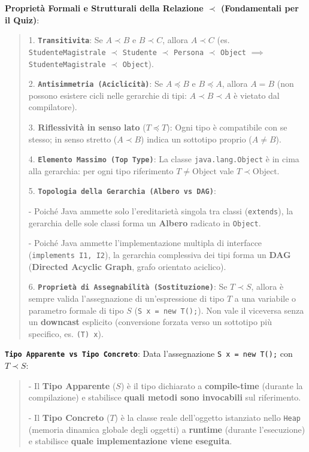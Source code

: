 \textbf{Proprietà Formali e Strutturali della Relazione $\prec$ (Fondamentali per il Quiz)}:

\begin{quote}\small

1. \textbf{\texttt{Transitivita}}: Se $A \prec B$ e $B \prec C$, allora $A \prec C$ (es. \texttt{StudenteMagistrale} $\prec$ \texttt{Studente} $\prec$ \texttt{Persona} $\prec$ \texttt{Object} $\implies$ \texttt{StudenteMagistrale} $\prec$ \texttt{Object}).

2. \textbf{\texttt{Antisimmetria (Aciclicità)}}: Se $A \preceq B$ e $B \preceq A$, allora $A = B$ (non possono esistere cicli nelle gerarchie di tipi: $A \prec B \prec A$ è vietato dal compilatore).

3. \textbf{Riflessività in senso lato} ($T \preceq T$): Ogni tipo è compatibile con se stesso; in senso stretto ($A \prec B$) indica un sottotipo proprio ($A \neq B$).

4. \textbf{\texttt{Elemento Massimo (Top Type)}}: La classe \texttt{java.lang.Object} è in cima alla gerarchia: per ogni tipo riferimento $T \neq \text{Object}$ vale $T \prec \text{Object}$.

5. \textbf{\texttt{Topologia della Gerarchia (Albero vs DAG)}}:

   - Poiché Java ammette solo l'ereditarietà singola tra classi (\texttt{extends}), la gerarchia delle sole classi forma un \textbf{Albero} radicato in \texttt{Object}.

   - Poiché Java ammette l'implementazione multipla di interfacce (\texttt{implements I1, I2}), la gerarchia complessiva dei tipi forma un \textbf{DAG} (\textbf{Directed Acyclic Graph}, grafo orientato aciclico).



6. \textbf{\texttt{Proprietà di Assegnabilità (Sostituzione)}}: Se $T \prec S$, allora è sempre valida l'assegnazione di un'espressione di tipo $T$ a una variabile o parametro formale di tipo $S$ (\texttt{S x = new T();}). Non vale il viceversa senza un \textbf{downcast} esplicito (conversione forzata verso un sottotipo più specifico, es. \texttt{(T) x}).

\end{quote}

\textbf{\texttt{Tipo Apparente vs Tipo Concreto}}: Data l'assegnazione \texttt{S x = new T();} con $T \prec S$:

\begin{quote}\small



- Il \textbf{Tipo Apparente} ($S$) è il tipo dichiarato a \textbf{compile-time} (durante la compilazione) e stabilisce \textbf{quali metodi sono invocabili} sul riferimento.

- Il \textbf{Tipo Concreto} ($T$) è la classe reale dell'oggetto istanziato nello \texttt{Heap} (memoria dinamica globale degli oggetti) a \textbf{runtime} (durante l'esecuzione) e stabilisce \textbf{quale implementazione viene eseguita}.

\end{quote}


